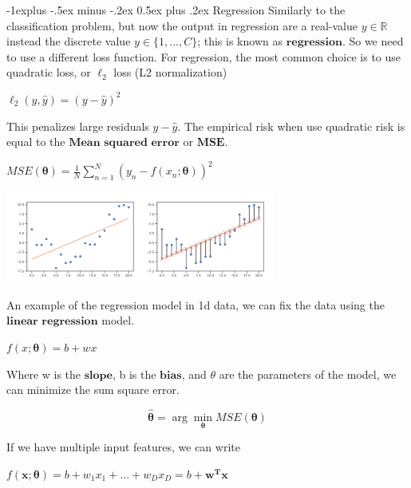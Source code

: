 \documentclass[10pt,landscape]{article}
\makeatletter
\renewcommand{\subsection}{\@startsection{subsection}{2}{0mm}%
                                {-1explus -.5ex minus -.2ex}%
                                {0.5ex plus .2ex}%
                                {\normalfont\normalsize\bfseries}}
\makeatother
\begin{document}
\begin{multicols*}{3}
\subsection{Regression}
    Similarly to the classification problem, but now the output in regression are a real-value $y \in \mathbb{R}$ instead the discrete value $y \in \{1,...,C\}$; this is known as $\textbf{regression}$.
    So we need to use a different loss function. For regression, the most common choice is to use quadratic loss, or $\ell_2$ loss (L2 normalization)
    \begin{center}
        $\ell_2(y,\hat{y}) = (y - \hat{y})^2$
    \end{center}
    This penalizes large residuals $y-\hat{y}$. The empirical risk when use quadratic risk is equal to the $\textbf{Mean squared error}$ or $\textbf{MSE}$.
    \begin{center}
        $MSE(\boldsymbol{\theta})=\frac{1}{N} \sum_{n=1}^{N}(y_n-f(x_n;\boldsymbol{\theta}))^2$
    \end{center}
    \begin{minipage}{\linewidth}
            \centering
            \includegraphics[width=3.5in]{figures/linear_regression.PNG}
    \end{minipage}
    An example of the regression model in 1d data, we can fix the data using the $\textbf{linear regression}$ model.
    \begin{center}
        $f(x;\boldsymbol{\theta})=b+wx$
    \end{center}
    Where w is the $\textbf{slope}$, b is the $\textbf{bias}$, and $\theta$ are the parameters of the model, we can minimize the sum square error.
    \begin{center}
        \[\hat{\boldsymbol{\theta}}=\arg\min_{\boldsymbol{\theta}}MSE(\boldsymbol{\theta})\]
    \end{center}
    If we have multiple input features, we can write
    \begin{center}
        $f(\mathbf{x};\boldsymbol{\theta})=b+w_1x_1+...+w_Dx_D=b+\mathbf{w^Tx}$
    \end{center}
    \begin{minipage}{\linewidth}
            \centering

\end{minipage}
\end{multicols*}
\end{document}

